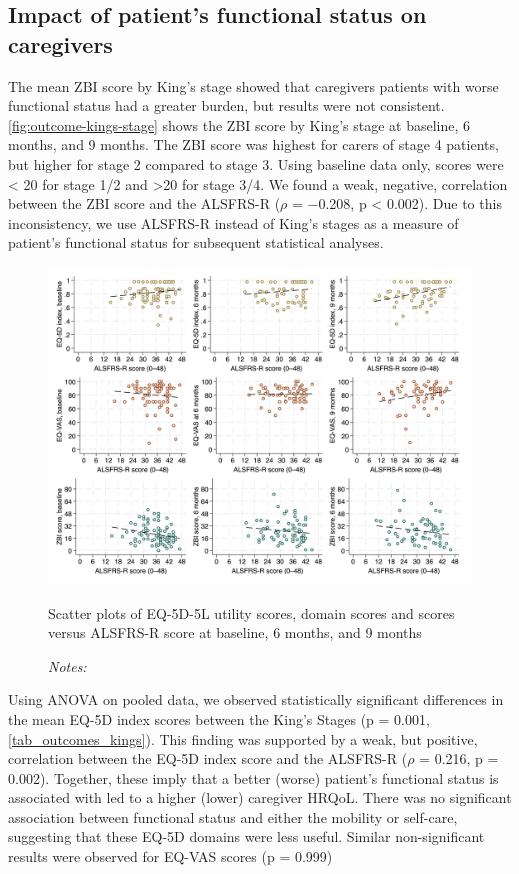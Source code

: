 \documentclass[12pt]{article}
\begin{document}
\subsection*{Impact of patient's functional status on caregivers}
The mean ZBI score by King's stage showed that caregivers patients with worse functional status had a greater burden, but results were not consistent. \autoref{fig:outcome-kings-stage} shows the ZBI score by King's stage at baseline, 6 months, and 9 months. The ZBI score was highest for carers of stage 4 patients, but higher for stage 2 compared to stage 3. Using baseline data only, scores were < 20 for stage 1/2 and >20 for stage 3/4. We found a weak, negative, correlation between the ZBI score and the ALSFRS-R ($\rho$ = −0.208, p < 0.002). Due to this inconsistency, we use ALSFRS-R instead of King's stages as a measure of patient's functional status for subsequent statistical analyses.

\begin{figure}[H]
    \centering
    \includegraphics[width=1\linewidth]{output/figures/outcome-als-frs.png}
    \caption{Scatter plots of EQ-5D-5L utility scores, domain scores and scores versus ALSFRS-R score at baseline, 6 months, and 9 months}
    \label{fig:dummy}
    \caption*{\footnotesize \textit{Notes:} }
\end{figure}

Using ANOVA on pooled data, we observed statistically significant differences in the mean EQ-5D index scores between the King’s Stages (p = 0.001, \autoref{tab_outcomes_kings}). This finding was supported by a weak, but positive, correlation between the EQ-5D index score and the ALSFRS-R ($\rho$ = 0.216, p = 0.002). Together, these imply that a better (worse) patient’s functional status is associated with led to a higher (lower) caregiver HRQoL. There was no significant association between functional status and either the mobility or self-care, suggesting that these EQ-5D domains were less useful. Similar non-significant results were observed for EQ-VAS scores (p = 0.999)
\end{document}
